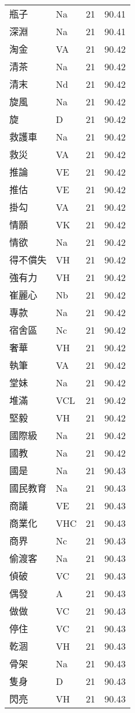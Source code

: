 \documentclass[twocolumn]{book}
\begin{document}
\begin{supertabular}{llrr}
瓶子 & Na & 21 &  90.41\\
深淵 & Na & 21 &  90.41\\
淘金 & VA & 21 &  90.42\\
清茶 & Na & 21 &  90.42\\
清末 & Nd & 21 &  90.42\\
旋風 & Na & 21 &  90.42\\
旋 & D & 21 &  90.42\\
救護車 & Na & 21 &  90.42\\
救災 & VA & 21 &  90.42\\
推論 & VE & 21 &  90.42\\
推估 & VE & 21 &  90.42\\
掛勾 & VA & 21 &  90.42\\
情願 & VK & 21 &  90.42\\
情欲 & Na & 21 &  90.42\\
得不償失 & VH & 21 &  90.42\\
強有力 & VH & 21 &  90.42\\
崔麗心 & Nb & 21 &  90.42\\
專款 & Na & 21 &  90.42\\
宿舍區 & Nc & 21 &  90.42\\
奢華 & VH & 21 &  90.42\\
執筆 & VA & 21 &  90.42\\
堂妹 & Na & 21 &  90.42\\
堆滿 & VCL & 21 &  90.42\\
堅毅 & VH & 21 &  90.42\\
國際級 & Na & 21 &  90.42\\
國教 & Na & 21 &  90.42\\
國是 & Na & 21 &  90.43\\
國民教育 & Na & 21 &  90.43\\
商議 & VE & 21 &  90.43\\
商業化 & VHC & 21 &  90.43\\
商界 & Nc & 21 &  90.43\\
偷渡客 & Na & 21 &  90.43\\
偵破 & VC & 21 &  90.43\\
偶發 & A & 21 &  90.43\\
做做 & VC & 21 &  90.43\\
停住 & VC & 21 &  90.43\\
乾涸 & VH & 21 &  90.43\\
骨架 & Na & 21 &  90.43\\
隻身 & D & 21 &  90.43\\
閃亮 & VH & 21 &  90.43\\

\end{supertabular}
\end{document}
